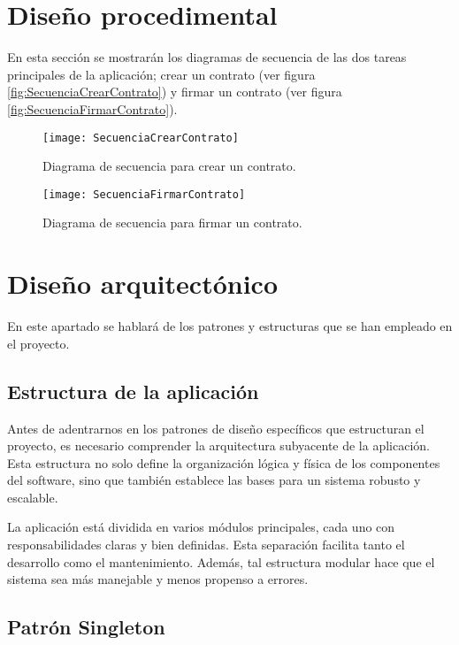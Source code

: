 \section{Diseño procedimental}

En esta sección se mostrarán los diagramas de secuencia de las dos tareas principales de la aplicación; crear un contrato (ver figura \ref{fig:SecuenciaCrearContrato}) y firmar un contrato (ver figura \ref{fig:SecuenciaFirmarContrato}).

\begin{figure}[h]
	\label{img:SecuenciaCrearContrato}
	\centering
	\texttt{[image: SecuenciaCrearContrato]}
	\caption[Diagrama secuencia creación contrato]{Diagrama de secuencia para crear un contrato.}
\end{figure}

\begin{figure}[h]
	\label{img:SecuenciaFirmarContrato}
	\centering
	\texttt{[image: SecuenciaFirmarContrato]}
	\caption[Diagrama secuencia firmar contrato]{Diagrama de secuencia para firmar un contrato.}
\end{figure}

\section{Diseño arquitectónico}

En este apartado se hablará de los patrones y estructuras que se han empleado en el proyecto.

\subsection{Estructura de la aplicación}

Antes de adentrarnos en los patrones de diseño específicos que estructuran el proyecto, es necesario comprender la arquitectura subyacente de la aplicación. 
Esta estructura no solo define la organización lógica y física de los componentes del software, sino que también establece las bases para un sistema robusto y escalable.

La aplicación está dividida en varios módulos principales, cada uno con responsabilidades claras y bien definidas. Esta separación facilita tanto el desarrollo como el mantenimiento. Además, tal estructura modular hace que el sistema sea más manejable y menos propenso a errores.

\subsection{Patrón Singleton}

